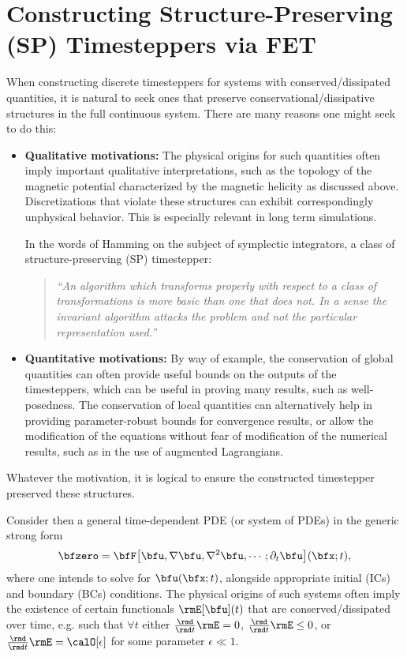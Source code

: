 \section{Constructing Structure-Preserving (SP) Timesteppers via FET}\label{cha:SP timesteppers}
    When constructing discrete timesteppers for systems with conserved/dissipated quantities, it is natural to seek ones that preserve conservational/dissipative structures in the full continuous system. There are many reasons one might seek to do this:
    \begin{itemize}
        \item  {\bf Qualitative motivations:} The physical origins for such quantities often imply important qualitative interpretations, such as the topology of the magnetic potential characterized by the magnetic helicity as discussed above. Discretizations that violate these structures can exhibit correspondingly unphysical behavior. This is especially relevant in long term simulations. 
        
        In the words of Hamming on the subject of symplectic integrators, a class of structure-preserving (SP) timestepper: \cite{Hamming_1986}
        \begin{quotation}
            \emph{``An algorithm which transforms properly with respect to a class of transformations is more basic than one that does not. In a sense the invariant algorithm attacks the problem and not the particular representation used.''}
        \end{quotation}

        \item  {\bf Quantitative motivations:} By way of example, the conservation of global quantities can often provide useful bounds on the outputs of the timesteppers, which can be useful in proving many results, such as well-posedness. The conservation of local quantities can alternatively help in providing parameter-robust bounds for convergence results, or allow the modification of the equations without fear of modification of the numerical results, such as in the use of augmented Lagrangians. \cite{FMW19, Laakmann_Farrell_Mitchell_22}
    \end{itemize}
    Whatever the motivation, it is logical to ensure the constructed timestepper preserved these structures.

    Consider then a general time-dependent PDE (or system of PDEs) in the generic strong form
    \begin{equation}\label{eqn:general time-dependent PDE}
        \bfzero  =  \bfF\!\left[\bfu, \nabla\bfu, \nabla^{2}\bfu, \cdots; \partial_{t}\bfu\right]\!(\bfx; t),
    \end{equation}
    where one intends to solve for $\bfu(\bfx; t)$, alongside appropriate initial (ICs) and boundary (BCs) conditions. The physical origins of such systems often imply the existence of certain functionals $\rmE[\bfu](t)$ that are conserved/dissipated over time, e.g. such that $\forall  t$ either $\frac{\rmd}{\rmd t}\rmE  =  0$, $\frac{\rmd}{\rmd t}\rmE  \leq  0$, or $\frac{\rmd}{\rmd t}\rmE  =  \calO[\epsilon]$ for some parameter $\epsilon \ll 1$.
    

